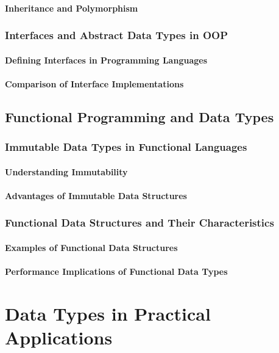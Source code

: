 \documentclass[12pt, oneside]{book}
\begin{document}
\subsubsection{Inheritance and Polymorphism}
\subsection{Interfaces and Abstract Data Types in OOP}
\subsubsection{Defining Interfaces in Programming Languages}
\subsubsection{Comparison of Interface Implementations}
\section{Functional Programming and Data Types}
\subsection{Immutable Data Types in Functional Languages}
\subsubsection{Understanding Immutability}
\subsubsection{Advantages of Immutable Data Structures}
\subsection{Functional Data Structures and Their Characteristics}
\subsubsection{Examples of Functional Data Structures}
\subsubsection{Performance Implications of Functional Data Types}

\chapter{Data Types in Practical Applications}
\end{document}
